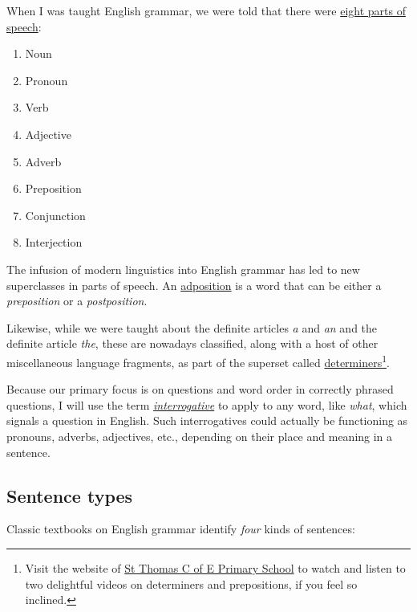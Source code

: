 \documentclass[
  12pt,
  a4paper,
]{article}
\providecommand{\tightlist}{%
  \setlength{\itemsep}{0pt}\setlength{\parskip}{0pt}}
\begin{document}
When I was taught English grammar, we were told that there were
\href{http://www.butte.edu/departments/cas/tipsheets/grammar/parts_of_speech.html}{eight
parts of speech}:

\begin{enumerate}
\tightlist
\item
  Noun
\item
  Pronoun
\item
  Verb
\item
  Adjective
\item
  Adverb
\item
  Preposition
\item
  Conjunction
\item
  Interjection
\end{enumerate}

The infusion of modern linguistics into English grammar has led to new
superclasses in parts of speech. An
\href{https://glossary.sil.org/term/adposition}{adposition} is a word
that can be either a \emph{preposition} or a \emph{postposition}.

Likewise, while we were taught about the definite articles \emph{a} and
\emph{an} and the definite article \emph{the}, these are nowadays
classified, along with a host of other miscellaneous language fragments,
as part of the superset called
\href{https://en.wikipedia.org/wiki/Determiner}{determiners}\footnote{Visit
  the website of
  \href{https://www.stthomaswernethprimary.co.uk/determiners-and-prepositions-1/}{St
  Thomas C of E Primary School} to watch and listen to two delightful
  videos on determiners and prepositions, if you feel so inclined.}.

Because our primary focus is on questions and word order in correctly
phrased questions, I will use the term
\href{https://en.wikipedia.org/wiki/Interrogative_word}{\emph{interrogative}}
to apply to any word, like \emph{what}, which signals a question in
English. Such interrogatives could actually be functioning as pronouns,
adverbs, adjectives, etc., depending on their place and meaning in a
sentence.

\hypertarget{sentence-types}{%
\subsection{Sentence types}\label{sentence-types}}

Classic textbooks on English grammar identify \emph{four} kinds of
sentences:
\end{document}
